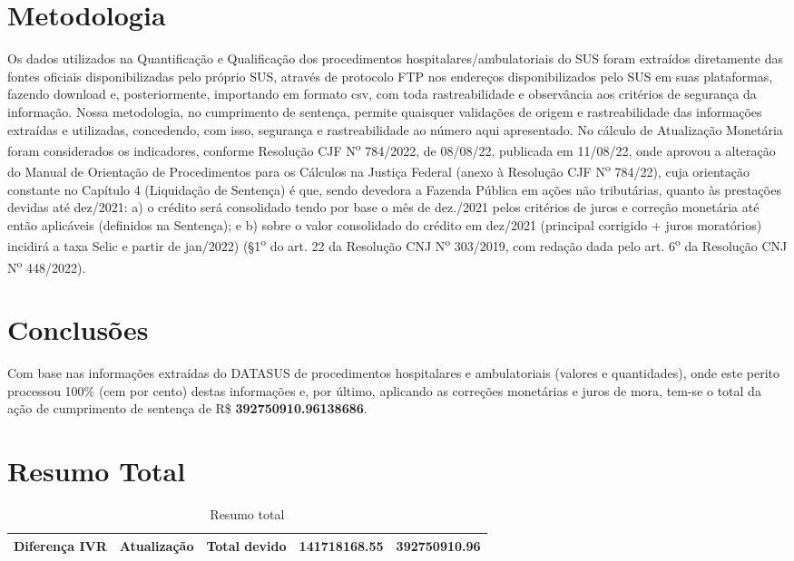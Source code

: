 \documentclass{report}
\begin{document}
\section{Metodologia}
Os dados utilizados na Quantificação e Qualificação dos procedimentos hospitalares/ambulatoriais do SUS foram extraídos diretamente das fontes oficiais disponibilizadas pelo próprio SUS, através de protocolo FTP nos endereços disponibilizados pelo SUS em suas plataformas, fazendo download e, posteriormente, importando em formato csv, com toda rastreabilidade e observância aos critérios de segurança da informação.
Nossa metodologia, no cumprimento de sentença, permite quaisquer validações de origem e rastreabilidade das informações extraídas e utilizadas, concedendo, com isso, segurança e rastreabilidade ao número aqui apresentado.
No cálculo de Atualização Monetária foram considerados os indicadores, conforme Resolução CJF N\textsuperscript{o} 784/2022, de 08/08/22, publicada em 11/08/22, onde aprovou a alteração do Manual de Orientação de Procedimentos para os Cálculos na Justiça Federal (anexo à Resolução CJF N\textsuperscript{o} 784/22), cuja orientação constante no Capítulo 4 (Liquidação de Sentença) é que, sendo devedora a Fazenda Pública em ações não tributárias, quanto às prestações devidas até dez/2021: a) o crédito será consolidado tendo por base o mês de dez./2021 pelos critérios de juros e correção monetária até então aplicáveis (definidos na Sentença); e b) sobre o valor consolidado do crédito em dez/2021 (principal corrigido + juros moratórios) incidirá a taxa Selic e partir de jan/2022) (\S 1\textsuperscript{o} do art. 22 da Resolução CNJ N\textsuperscript{o} 303/2019, com redação dada pelo art. 6\textsuperscript{o} da Resolução CNJ  N\textsuperscript{o} 448/2022).

\section{Conclusões}
Com base nas informações extraídas do DATASUS de procedimentos hospitalares e ambulatoriais (valores e quantidades), onde este perito processou 100\% (cem por cento) destas informações e, por último, aplicando as correções monetárias e juros de mora, tem-se o total da ação de cumprimento de sentença de R\$ \textbf{392750910.96138686}.

\section{Resumo Total}
\begin{longtable}[c]{|p{1.7cm}|p{2.6cm}|p{2.6cm}|p{2.3cm}|}
	\caption{Resumo total} \\ \hline
	\textbf{Diferença IVR} &
	\textbf{Atualização} &
	\textbf{Total devido}
	\endhead {} & 141718168.55 & 392750910.96\\ \hline
    \end{longtable}
\end{document}
